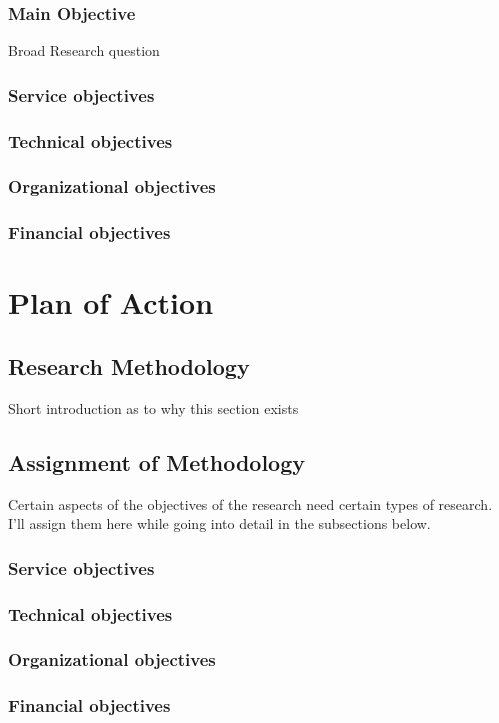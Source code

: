 \documentclass[signatures]{Thesis}
\begin{document}
  	\subsection{Main Objective}
  	Broad Research question
  	\subsection{Service objectives}
    \subsection{Technical objectives}
    \subsection{Organizational objectives}
    \subsection{Financial objectives}

\chapter{Plan of Action}
  	\section{Research Methodology}
  	Short introduction as to why this section exists
  	\section{Assignment of Methodology}
    Certain aspects of the objectives of the research need certain types of research. I'll assign them here while going into detail in the subsections below.
	    \subsection{Service objectives}
	    \subsection{Technical objectives}
	    \subsection{Organizational objectives}
	    \subsection{Financial objectives}
\end{document}
